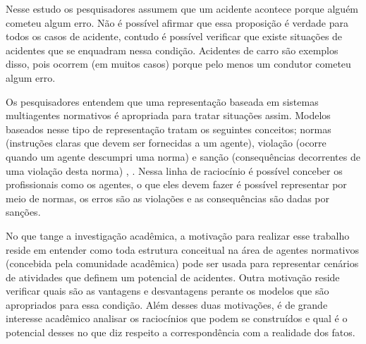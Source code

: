 Nesse estudo os pesquisadores assumem que um acidente acontece porque alguém cometeu algum erro. Não é possível afirmar que essa proposição é verdade para todos os casos de acidente, contudo é possível verificar que existe situações de acidentes que se enquadram nessa condição. Acidentes de carro são exemplos disso, pois ocorrem (em muitos casos) porque pelo menos um condutor cometeu algum erro. 

Os pesquisadores entendem que uma representação baseada em sistemas multiagentes normativos é apropriada para tratar situações assim. Modelos baseados nesse tipo de representação tratam os seguintes conceitos; normas (instruções claras que devem ser fornecidas a um agente), violação (ocorre quando um agente descumpri uma norma) e sanção (consequências decorrentes de uma violação desta norma) \cite{dastaniframework} \cite{amodelmultiagentsystemdynamicrelationship}, \cite{ontologynormative}. Nessa linha de raciocínio é possível conceber os profissionais como os agentes, o que eles devem fazer é possível representar por meio de normas, os erros são as violações e as consequências são dadas por sanções.  

No que tange a investigação acadêmica, a motivação para realizar esse trabalho reside em entender como toda estrutura conceitual na área de agentes normativos (concebida pela comunidade acadêmica) pode ser usada para representar cenários de atividades que definem um potencial de acidentes. Outra motivação reside verificar quais são as vantagens e desvantagens perante os modelos que são apropriados para essa condição. Além desses duas motivações, é de grande interesse acadêmico analisar os raciocínios que podem se construídos e qual é o potencial desses no que diz respeito a correspondência com a realidade dos fatos. 